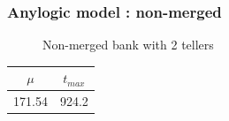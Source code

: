 \documentclass[10pt]{beamer}
\begin{document}
\begin{frame}
  \frametitle{Anylogic model : non-merged}
  \begin{figure}
  \centering
{}

\caption{Non-merged bank with 2 tellers}
  \end{figure}
  
\begin{table}
\centering
\begin{tabular}{|c|c|}
\hline
$\mu$ & $t_{max}$ \\
\hline
171.54 & 924.2 \\
\hline
\end{tabular} 
\end{table}

\end{frame}
\end{document}
